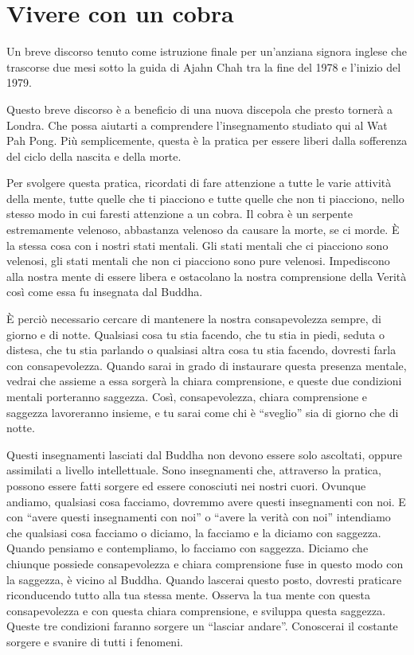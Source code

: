 \chapter{Vivere con un cobra}

\begin{openingQuote}
  \centering

  Un breve discorso tenuto come istruzione finale per un'anziana signora inglese
  che trascorse due mesi sotto la guida di Ajahn Chah tra la fine del 1978 e
  l'inizio del 1979.
\end{openingQuote}

Questo breve discorso è a beneficio di una nuova discepola che presto
tornerà a Londra. Che possa aiutarti a comprendere l'insegnamento
studiato qui al Wat Pah Pong. Più semplicemente, questa è la pratica per
essere liberi dalla sofferenza del ciclo della nascita e della morte.

Per svolgere questa pratica, ricordati di fare attenzione a tutte le
varie attività della mente, tutte quelle che ti piacciono e tutte quelle
che non ti piacciono, nello stesso modo in cui faresti attenzione a un
cobra. Il cobra è un serpente estremamente velenoso, abbastanza velenoso
da causare la morte, se ci morde. È la stessa cosa con i nostri stati
mentali. Gli stati mentali che ci piacciono sono velenosi, gli stati
mentali che non ci piacciono sono pure velenosi. Impediscono alla nostra
mente di essere libera e ostacolano la nostra comprensione della Verità
così come essa fu insegnata dal Buddha.

È perciò necessario cercare di mantenere la nostra consapevolezza
sempre, di giorno e di notte. Qualsiasi cosa tu stia facendo, che tu
stia in piedi, seduta o distesa, che tu stia parlando o qualsiasi altra
cosa tu stia facendo, dovresti farla con consapevolezza. Quando sarai in
grado di instaurare questa presenza mentale, vedrai che assieme a essa
sorgerà la chiara comprensione, e queste due condizioni mentali
porteranno saggezza. Così, consapevolezza, chiara comprensione e
saggezza lavoreranno insieme, e tu sarai come chi è ``sveglio'' sia di
giorno che di notte.

Questi insegnamenti lasciati dal Buddha non devono essere solo
ascoltati, oppure assimilati a livello intellettuale. Sono insegnamenti
che, attraverso la pratica, possono essere fatti sorgere ed essere
conosciuti nei nostri cuori. Ovunque andiamo, qualsiasi cosa facciamo,
dovremmo avere questi insegnamenti con noi. E con ``avere questi
insegnamenti con noi'' o ``avere la verità con noi'' intendiamo che
qualsiasi cosa facciamo o diciamo, la facciamo e la diciamo con
saggezza. Quando pensiamo e contempliamo, lo facciamo con saggezza.
Diciamo che chiunque possiede consapevolezza e chiara comprensione fuse
in questo modo con la saggezza, è vicino al Buddha. Quando lascerai
questo posto, dovresti praticare riconducendo tutto alla tua stessa
mente. Osserva la tua mente con questa consapevolezza e con questa
chiara comprensione, e sviluppa questa saggezza. Queste tre condizioni
faranno sorgere un ``lasciar andare''. Conoscerai il costante sorgere e
svanire di tutti i fenomeni.

